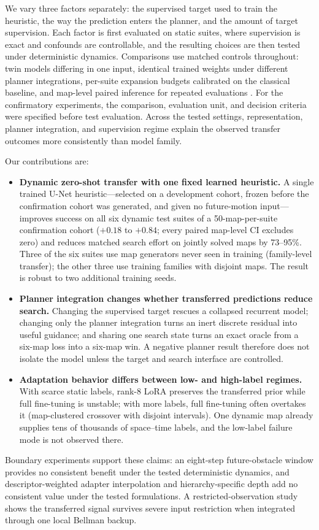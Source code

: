 \documentclass[letterpaper]{article} %
\begin{document}
We vary three factors separately: the supervised target used to train the heuristic, the way the prediction enters the planner, and the amount of target supervision. Each factor is first evaluated on static suites, where supervision is exact and confounds are controllable, and the resulting choices are then tested under deterministic dynamics. Comparisons use matched controls throughout: twin models differing in one input, identical trained weights under different planner integrations, per-suite expansion budgets calibrated on the classical baseline, and map-level paired inference for repeated evaluations \citep{henderson2018matters,agarwal2021precipice,pineau2021reproducibility}. For the confirmatory experiments, the comparison, evaluation unit, and decision criteria were specified before test evaluation. Across the tested settings, representation, planner integration, and supervision regime explain the observed transfer outcomes more consistently than model family.

Our contributions are:
\begin{itemize}
    \item \textbf{Dynamic zero-shot transfer with one fixed learned heuristic.} A single trained U-Net heuristic---selected on a development cohort, frozen before the confirmation cohort was generated, and given no future-motion input---improves success on all six dynamic test suites of a 50-map-per-suite confirmation cohort ($+0.18$ to $+0.84$; every paired map-level CI excludes zero) and reduces matched search effort on jointly solved maps by 73--95\%. Three of the six suites use map generators never seen in training (family-level transfer); the other three use training families with disjoint maps. The result is robust to two additional training seeds.
    \item \textbf{Planner integration changes whether transferred predictions reduce search.} Changing the supervised target rescues a collapsed recurrent model; changing only the planner integration turns an inert discrete residual into useful guidance; and sharing one search state turns an exact oracle from a six-map loss into a six-map win. A negative planner result therefore does not isolate the model unless the target and search interface are controlled.
    \item \textbf{Adaptation behavior differs between low- and high-label regimes.} With scarce static labels, rank-8 LoRA preserves the transferred prior while full fine-tuning is unstable; with more labels, full fine-tuning often overtakes it (map-clustered crossover with disjoint intervals). One dynamic map already supplies tens of thousands of space--time labels, and the low-label failure mode is not observed there.
\end{itemize}
Boundary experiments support these claims: an eight-step future-obstacle window provides no consistent benefit under the tested deterministic dynamics, and descriptor-weighted adapter interpolation and hierarchy-specific depth add no consistent value under the tested formulations. A restricted-observation study shows the transferred signal survives severe input restriction when integrated through one local Bellman backup.
\end{document}
